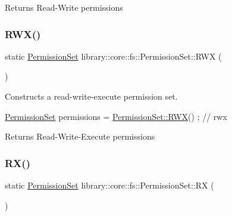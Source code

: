 \begin{DoxyReturn}{Returns}
Read-\/\+Write permissions 
\end{DoxyReturn}
\mbox{\label{classlibrary_1_1core_1_1fs_1_1_permission_set_afa3f9d07a7053240ae97c587543cdb00}} 
\subsubsection{\texorpdfstring{R\+W\+X()}{RWX()}}
{\footnotesize\ttfamily static \hyperlink{classlibrary_1_1core_1_1fs_1_1_permission_set}{Permission\+Set} library\+::core\+::fs\+::\+Permission\+Set\+::\+R\+WX (\begin{DoxyParamCaption}{ }\end{DoxyParamCaption})\hspace{0.3cm}{\ttfamily [static]}}



Constructs a read-\/write-\/execute permission set. 


\begin{DoxyCode}
\hyperlink{classlibrary_1_1core_1_1fs_1_1_permission_set_a8a6eb39cc2a8bca92a657d065d3e36ba}{PermissionSet} permissions = \hyperlink{classlibrary_1_1core_1_1fs_1_1_permission_set_afa3f9d07a7053240ae97c587543cdb00}{PermissionSet::RWX}() ; \textcolor{comment}{// rwx}
\end{DoxyCode}


\begin{DoxyReturn}{Returns}
Read-\/\+Write-\/\+Execute permissions 
\end{DoxyReturn}
\mbox{\label{classlibrary_1_1core_1_1fs_1_1_permission_set_ab632d79f1b8b8f4577bc06fa622b1c09}} 
\subsubsection{\texorpdfstring{R\+X()}{RX()}}
{\footnotesize\ttfamily static \hyperlink{classlibrary_1_1core_1_1fs_1_1_permission_set}{Permission\+Set} library\+::core\+::fs\+::\+Permission\+Set\+::\+RX (\begin{DoxyParamCaption}{ }\end{DoxyParamCaption})\hspace{0.3cm}{\ttfamily [static]}}



